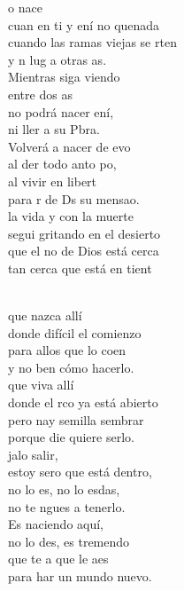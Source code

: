 \begin{cancion}%
	o nace  \\
	cuan en ti y ení no quenada\\
	cuando las ramas viejas se rten\\
	y n lug a otras as.\\
	Mientras siga viendo   \\
	entre dos as \\
	no podrá nacer ení,\\
	ni ller a  su Pbra. \\
	Volverá a nacer de evo\\
	al der todo anto po, \\
	al vivir en libert\\
	para r de Ds su mensao.\\
	 la vida y con la muerte\\
	segui gritando en el desierto  \\
	que el no de Dios está cerca\\
	tan cerca que está en tient\\\jump\\
	\begin{chorus}%
	 que nazca allí\\
	donde  difícil el comienzo\\
	para allos que lo coen\\
	y no ben cómo hacerlo.\\
	 que viva allí\\
	donde el rco ya está abierto\\
	pero nay semilla  sembrar\\
	porque die quiere serlo.\\
	jalo salir,\\
	estoy sero que está dentro,\\
	no lo es, no lo esdas,\\
	no te ngues a tenerlo.\\
	Es naciendo aquí,\\
	no lo des, es tremendo\\
	que te a que le aes\\
	para har un mundo nuevo.\\
	\end{chorus}%
	\jump\\
\end{cancion}%
